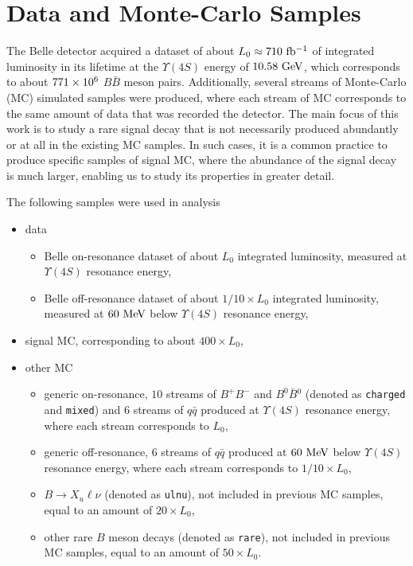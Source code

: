 \chapter{Data and Monte-Carlo Samples}\label{sec:data-and-monte-carlo-samples}

The Belle detector acquired a dataset of about $L_0 \approx 710\mathrm{~fb^{-1}}$ of integrated luminosity in its lifetime at the $\Upsilon(4S)$ energy of $10.58\mathrm{~GeV}$, which corresponds to about $771\times 10^{6}$ $B \bar B$ meson pairs. Additionally, several streams of Monte-Carlo (MC) simulated samples were produced, where each stream of MC corresponds to the same amount of data that was recorded the detector. The main focus of this work is to study a rare signal decay that is not necessarily produced abundantly or at all in the existing MC samples. In such cases, it is a common practice to produce specific samples of signal MC, where the abundance of the signal decay is much larger, enabling us to study its properties in greater detail.

The following samples were used in analysis
\begin{itemize}
	\item data
	\begin{itemize}
		\item Belle on-resonance dataset of about $L_0$ integrated luminosity, measured at $\Upsilon(4S)$ resonance energy,
		\item Belle off-resonance dataset of about $1/10 \times L_0$ integrated luminosity, measured at $60\mathrm{~MeV}$ below $\Upsilon(4S)$ resonance energy,
	\end{itemize}
	\item signal MC, corresponding to about $400 \times L_0$,
	\item other MC
	\begin{itemize}
		\item generic on-resonance, $10$ streams of $B^+B^-$ and $B^0\bar B{}^0$ (denoted as \texttt{charged} and \texttt{mixed}) and $6$ streams of $q\bar q$ produced at $\Upsilon(4S)$ resonance energy, where each stream corresponds to $L_0$,
		\item generic off-resonance, $6$ streams of $q\bar q$ produced at $60\mathrm{~MeV}$ below $\Upsilon(4S)$ resonance energy, where each stream corresponds to $1/10 \times L_0$,
		\item $B\to X_u \ell \nu$ (denoted as \texttt{ulnu}), not included in previous MC samples, equal to an amount of $20 \times L_0$, 
		\item other rare $B$ meson decays (denoted as \texttt{rare}), not included in previous MC samples, equal to an amount of $50 \times L_0$.
	\end{itemize}
\end{itemize}
\newpage
